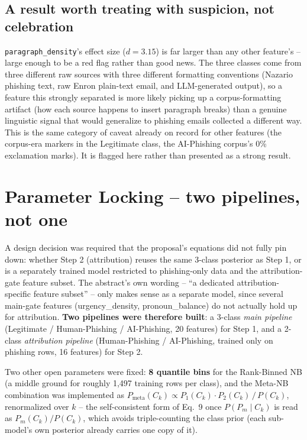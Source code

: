 \documentclass[11pt]{article}
\begin{document}
\subsection*{A result worth treating with suspicion, not celebration}
\texttt{paragraph\_density}'s effect size ($d=3.15$) is far larger than any other feature's -- large
enough to be a red flag rather than good news. The three classes come from three different raw
sources with three different formatting conventions (Nazario phishing text, raw Enron plain-text email,
and LLM-generated output), so a feature this strongly separated is more likely picking up a
corpus-formatting artifact (how each source happens to insert paragraph breaks) than a genuine
linguistic signal that would generalize to phishing emails collected a different way. This is the same
category of caveat already on record for other features (the corpus-era markers in the Legitimate class,
the AI-Phishing corpus's 0\% exclamation marks). It is flagged here rather than presented as a strong
result.

\section{Parameter Locking -- two pipelines, not one}
A design decision was required that the proposal's equations did not fully pin down: whether Step 2
(attribution) reuses the same 3-class posterior as Step 1, or is a separately trained model restricted to
phishing-only data and the attribution-gate feature subset. The abstract's own wording -- ``a dedicated
attribution-specific feature subset'' -- only makes sense as a separate model, since several main-gate
features (urgency\_density, pronoun\_balance) do not actually hold up for attribution. \textbf{Two
pipelines were therefore built}: a 3-class \emph{main pipeline} (Legitimate / Human-Phishing /
AI-Phishing, 20 features) for Step 1, and a 2-class \emph{attribution pipeline} (Human-Phishing /
AI-Phishing, trained only on phishing rows, 16 features) for Step 2.

Two other open parameters were fixed: \textbf{8 quantile bins} for the Rank-Binned NB (a middle ground
for roughly 1{,}497 training rows per class), and the Meta-NB combination was implemented as
$P_{\text{meta}}(C_k) \propto P_1(C_k)\cdot P_2(C_k) \,/\, P(C_k)$, renormalized over $k$ -- the
self-consistent form of Eq.~9 once $P(P_m\mid C_k)$ is read as $P_m(C_k)/P(C_k)$, which avoids
triple-counting the class prior (each sub-model's own posterior already carries one copy of it).
\end{document}
